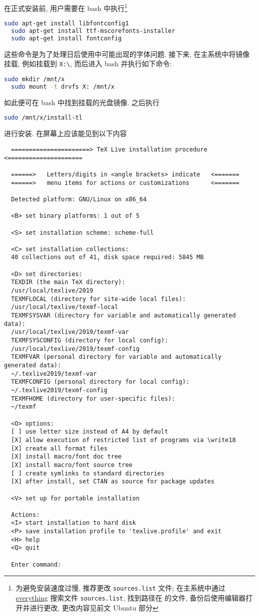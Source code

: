 在正式安装前,
用户需要在 \textsf{bash} 中执行\footnote{为避免安装速度过慢, 推荐更改 \texttt{sources.list} 文件; 在主系统中通过 \href{https://www.voidtools.com/zh-cn/}{everything} 搜索文件 \texttt{sources.list}, 找到路径在  的文件, 备份后使用编辑器打开并进行更改, 更改内容见前文 Ubuntu 部分} 
\begin{lstlisting}[language=bash]
  sudo apt-get install libfontconfig1
  sudo apt-get install ttf-mscorefonts-installer
  sudo apt-get install fontconfig
\end{lstlisting}
这些命令是为了处理日后使用中可能出现的字体问题.
接下来, 在主系统中将镜像挂载,
例如挂载到 \texttt{X:\textbackslash},
而后进入 \textsf{bash} 并执行如下命令:
\begin{lstlisting}[language = bash]
  sudo mkdir /mnt/x
  sudo mount -t drvfs X: /mnt/x
\end{lstlisting}
如此便可在 \textsf{bash} 中找到挂载的光盘镜像.
之后执行
\begin{lstlisting}[language = bash]
  sudo /mnt/x/install-tl
\end{lstlisting}
进行安装.
在屏幕上应该能见到以下内容
\begin{lstlisting}
  ======================> TeX Live installation procedure <=====================

  ======>   Letters/digits in <angle brackets> indicate   <=======
  ======>   menu items for actions or customizations      <=======
  
  Detected platform: GNU/Linux on x86_64
  
  <B> set binary platforms: 1 out of 5
  
  <S> set installation scheme: scheme-full
  
  <C> set installation collections:
  40 collections out of 41, disk space required: 5845 MB
  
  <D> set directories:
  TEXDIR (the main TeX directory):
  /usr/local/texlive/2019
  TEXMFLOCAL (directory for site-wide local files):
  /usr/local/texlive/texmf-local
  TEXMFSYSVAR (directory for variable and automatically generated data):
  /usr/local/texlive/2019/texmf-var
  TEXMFSYSCONFIG (directory for local config):
  /usr/local/texlive/2019/texmf-config
  TEXMFVAR (personal directory for variable and automatically generated data):
  ~/.texlive2019/texmf-var
  TEXMFCONFIG (personal directory for local config):
  ~/.texlive2019/texmf-config
  TEXMFHOME (directory for user-specific files):
  ~/texmf

  <O> options:
  [ ] use letter size instead of A4 by default
  [X] allow execution of restricted list of programs via \write18
  [X] create all format files
  [X] install macro/font doc tree
  [X] install macro/font source tree
  [ ] create symlinks to standard directories
  [X] after install, set CTAN as source for package updates
  
  <V> set up for portable installation
  
  Actions:
  <I> start installation to hard disk
  <P> save installation profile to 'texlive.profile' and exit
  <H> help
  <Q> quit
  
  Enter command: 
\end{lstlisting}

